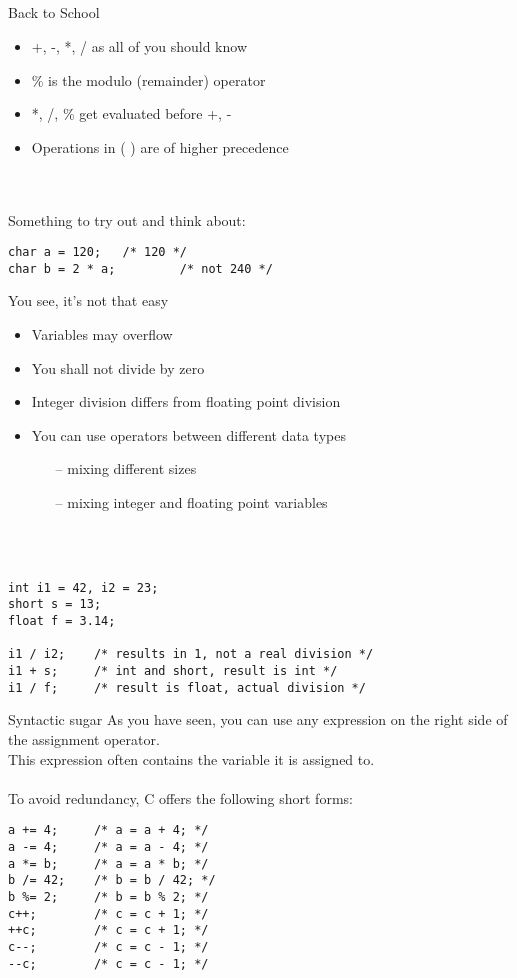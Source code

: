 \subsection{}
\begin{frame}[fragile]{Back to School}
	\begin{itemize}
		\item +, -, *, / as all of you should know
		\item \% is the modulo (remainder) operator
		\item *, /, \% get evaluated before +, -
		\item Operations in (  ) are of higher precedence
	\end{itemize}
	\ \\\ \\Something to try out and think about:
	\begin{lstlisting}[numbers=none]
char a = 120;	/* 120 */
char b = 2 * a;			/* not 240 */
\end{lstlisting}
\end{frame}
\begin{frame}[fragile]{You see, it's not that easy}
	\begin{itemize}
		\item Variables may overflow
		\item You shall not divide by zero
		\item Integer division differs from floating point division
		\item You can use operators between different data types
		\begin{itemize}
			\item[--] mixing different sizes
			\item[--] mixing integer and floating point variables
		\end{itemize}
	\end{itemize}
	\ \\\ \\
	\begin{lstlisting}[numbers=none]
int i1 = 42, i2 = 23;
short s = 13;
float f = 3.14;

i1 / i2;	/* results in 1, not a real division */
i1 + s;		/* int and short, result is int */
i1 / f;		/* result is float, actual division */
\end{lstlisting}
\end{frame}
\begin{frame}[fragile]{Syntactic sugar}
	As you have seen, you can use any expression on the right side of the assignment operator.\\
	This expression often contains the variable it is assigned to.\\\ \\
	To avoid redundancy, C offers the following short forms:\\
	\begin{lstlisting}[numbers=none]
a += 4;		/* a = a + 4; */
a -= 4;		/* a = a - 4; */
a *= b;		/* a = a * b; */
b /= 42;	/* b = b / 42; */
b %= 2;		/* b = b % 2; */
c++;		/* c = c + 1; */
++c;		/* c = c + 1; */
c--;		/* c = c - 1; */
--c;		/* c = c - 1; */
\end{lstlisting}
\end{frame}

